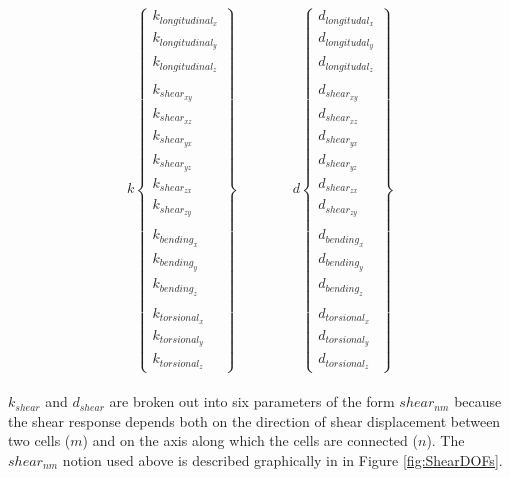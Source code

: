 {\[ k  \left\{ \begin{array}{ccc}
k_{longitudinal_x}\\
k_{longitudinal_y}\\
k_{longitudinal_z}\\
\\
k_{shear_{xy}}\\
k_{shear_{xz}}\\
k_{shear_{yx}}\\
k_{shear_{yz}}\\
k_{shear_{zx}}\\
k_{shear_{zy}}\\
\\
k_{bending_x}\\
k_{bending_y}\\
k_{bending_z}\\
\\
k_{torsional_x}\\
k_{torsional_y}\\
k_{torsional_z}
 \end{array} \right\} 
 \qquad\qquad
 d  \left\{ \begin{array}{ccc}
d_{longitudal_x}\\
d_{longitudal_y}\\
d_{longitudal_z}\\
\\
d_{shear_{xy}}\\
d_{shear_{xz}}\\
d_{shear_{yx}}\\
d_{shear_{yz}}\\
d_{shear_{zx}}\\
d_{shear_{zy}}\\
\\
d_{bending_x}\\
d_{bending_y}\\
d_{bending_z}\\
\\
d_{torsional_x}\\
d_{torsional_y}\\
d_{torsional_z}
 \end{array} \right\}  \]
\\

$k_{shear}$ and $d_{shear}$ are broken out into six parameters of the form $shear_{nm}$ because the shear response depends both on the direction of shear displacement between two cells ($m$) and on the axis along which the cells are connected ($n$).  The $shear_{nm}$ notion used above is described graphically in in Figure \ref{fig:ShearDOFs}.\\

}
